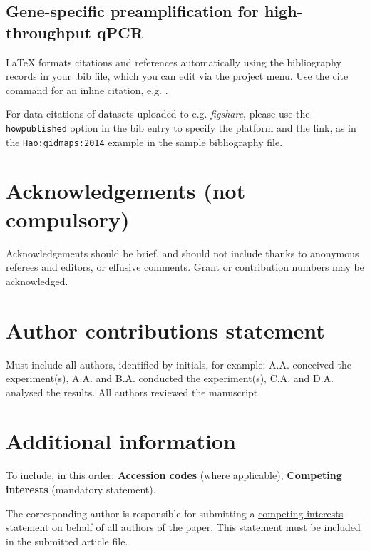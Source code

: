 \documentclass[fleqn,10pt]{wlscirep}
\begin{document}
\subsection*{Gene-specific preamplification for high-throughput qPCR}




\noindent LaTeX formats citations and references automatically using the bibliography records in your .bib file, which you can edit via the project menu. Use the cite command for an inline citation, e.g.  \cite{Hao:gidmaps:2014}.

For data citations of datasets uploaded to e.g. \emph{figshare}, please use the \verb|howpublished| option in the bib entry to specify the platform and the link, as in the \verb|Hao:gidmaps:2014| example in the sample bibliography file.

\section*{Acknowledgements (not compulsory)}

Acknowledgements should be brief, and should not include thanks to anonymous referees and editors, or effusive comments. Grant or contribution numbers may be acknowledged.

\section*{Author contributions statement}

Must include all authors, identified by initials, for example:
A.A. conceived the experiment(s),  A.A. and B.A. conducted the experiment(s), C.A. and D.A. analysed the results.  All authors reviewed the manuscript. 

\section*{Additional information}

To include, in this order: \textbf{Accession codes} (where applicable); \textbf{Competing interests} (mandatory statement). 

The corresponding author is responsible for submitting a \href{http://www.nature.com/srep/policies/index.html#competing}{competing interests statement} on behalf of all authors of the paper. This statement must be included in the submitted article file.
\end{document}
